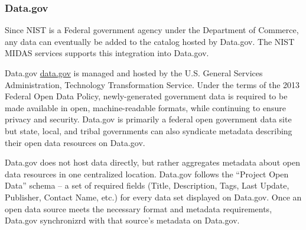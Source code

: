 \subsubsection{Data.gov}
 Since NIST is a  Federal government agency under the Department of Commerce, any data can eventually be added to the catalog hosted by Data.gov.  The NIST MIDAS services supports this integration into Data.gov.

Data.gov \url{data.gov} is managed and hosted by the U.S. General Services Administration, Technology Transformation Service. Under the terms of the 2013 Federal Open Data Policy, newly-generated government data is required to be made available in open, machine-readable formats, while continuing to ensure privacy and security. Data.gov is primarily a federal open government data site but state, local, and tribal governments can also syndicate metadata describing their open data resources on Data.gov. 

Data.gov does not host data directly, but rather aggregates metadata about open data resources in one centralized location. Data.gov follows the ``Project Open Data'' schema – a set of required fields (Title, Description, Tags, Last Update, Publisher, Contact Name, etc.) for every data set displayed on Data.gov. Once an open data source meets the necessary format and metadata requirements,  Data.gov  synchronizrd with that source’s metadata on Data.gov.

